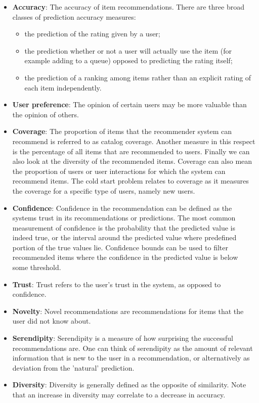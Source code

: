 \begin{itemize}
	\item \textbf{Accuracy}: The accuracy of item recommendations. There are three broad classes of prediction accuracy measures:
	\begin{itemize}
		\item the prediction of the rating given by a user;
		\item the prediction whether or not a user will actually use the item (for example adding to a queue) opposed to predicting the rating itself;
		\item the prediction of a ranking among items rather than an explicit rating of each item independently.
	\end{itemize}
	\item \textbf{User preference}: The opinion of certain users may be more valuable than the opinion of others.
	\item \textbf{Coverage}: The proportion of items that the recommender system can recommend is referred to as catalog coverage. Another measure in this respect is the percentage of all items that are recommended to users. Finally we can also look at the diversity of the recommended items. Coverage can also mean the proportion of users or user interactions for which the system can recommend items.
The cold start problem relates to coverage as it measures the coverage for a specific type of users, namely new users.
	\item \textbf{Confidence}: Confidence in the recommendation can be defined as the systems trust in its recommendations or predictions. The most common measurement of confidence is the probability that the predicted value is indeed true, or the interval around the predicted value where predefined portion of the true values lie. Confidence bounds can be used to filter recommended items where the confidence in the predicted value is below some threshold.
	\item \textbf{Trust}: Trust refers to the user's trust in the system, as opposed to confidence.
	\item \textbf{Novelty}: Novel recommendations are recommendations for items that the user did not know about.
	\item \textbf{Serendipity}: Serendipity is a measure of how surprising the successful recommendations are. One can think of serendipity as the amount of relevant information that is new to the user in a recommendation, or alternatively as deviation from the 'natural' prediction.
	\item \textbf{Diversity}: Diversity is generally defined as the opposite of similarity. Note that an increase in diversity may correlate to a decrease in accuracy.
\end{itemize}


